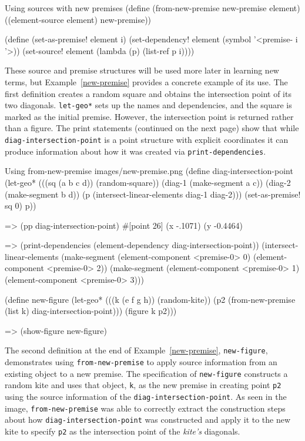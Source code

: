 \begin{code-example}
[label=new-premises]
{Using sources with new premises}
(define (from-new-premise new-premise element)
  ((element-source element) new-premise))

(define (set-as-premise! element i)
  (set-dependency! element (symbol '<premise- i '>))
  (set-source! element (lambda (p) (list-ref p i))))
\end{code-example}

These source and premise structures will be used more later in
learning new terms, but Example~\ref{new-premise} provides a concrete
example of its use. The first definition creates a random square and
obtains the intersection point of its two diagonals. \texttt{let-geo*}
sets up the names and dependencies, and the square is marked as the
initial premise. However, the intersection point is returned rather
than a figure.  The print statements (continued on the next page) show
that while \texttt{diag-intersection-point} is a point structure with
explicit coordinates it can produce information about how it was
created via \texttt{print-dependencies}.

\begin{img-example}
[label=new-premise, breakable]
{Using from-new-premise}
{images/new-premise.png}
(define diag-intersection-point
  (let-geo*
      (((sq (a b c d)) (random-square))
       (diag-1 (make-segment a c))
       (diag-2 (make-segment b d))
       (p (intersect-linear-elements diag-1 diag-2)))
    (set-as-premise! sq 0)
    p))

=> (pp diag-intersection-point)
#[point 26] (x -.1071) (y -0.4464)

=> (print-dependencies (element-dependency diag-intersection-point))
(intersect-linear-elements
 (make-segment (element-component <premise-0> 0)
               (element-component <premise-0> 2))
 (make-segment (element-component <premise-0> 1)
               (element-component <premise-0> 3)))

(define new-figure
  (let-geo* (((k (e f g h)) (random-kite))
             (p2 (from-new-premise (list k) diag-intersection-point)))
    (figure k p2)))

=> (show-figure new-figure)
\end{img-example}

The second definition at the end of Example~\ref{new-premise},
\texttt{new-figure}, demonstrates using \texttt{from-new-premise} to
apply source information from an existing object to a new premise.
The specification of \texttt{new-figure} constructs a random kite and
uses that object, \texttt{k}, as the new premise in creating point
\texttt{p2} using the source information of the
\texttt{diag-intersection-point}. As seen in the image,
\texttt{from-new-premise} was able to correctly extract the
construction steps about how \texttt{diag-intersection-point} was
constructed and apply it to the new kite to specify \texttt{p2} as the
intersection point of the \emph{kite's} diagonals.

